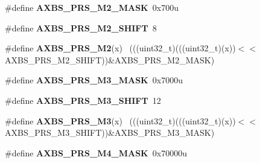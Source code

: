 \begin{DoxyCompactItemize}
\item 
\hypertarget{group___a_x_b_s___register___masks_gacd2feac8facc9d0b21f438eef172fd81}{}\#define {\bfseries A\+X\+B\+S\+\_\+\+P\+R\+S\+\_\+\+M2\+\_\+\+M\+A\+S\+K}~0x700u\label{group___a_x_b_s___register___masks_gacd2feac8facc9d0b21f438eef172fd81}

\item 
\hypertarget{group___a_x_b_s___register___masks_gacf78955a5852e31c71c1542d873df6b3}{}\#define {\bfseries A\+X\+B\+S\+\_\+\+P\+R\+S\+\_\+\+M2\+\_\+\+S\+H\+I\+F\+T}~8\label{group___a_x_b_s___register___masks_gacf78955a5852e31c71c1542d873df6b3}

\item 
\hypertarget{group___a_x_b_s___register___masks_ga62c82426cf92f9a2296ab84014ee8096}{}\#define {\bfseries A\+X\+B\+S\+\_\+\+P\+R\+S\+\_\+\+M2}(x)                                                  ~(((uint32\+\_\+t)(((uint32\+\_\+t)(x))$<$$<$A\+X\+B\+S\+\_\+\+P\+R\+S\+\_\+\+M2\+\_\+\+S\+H\+I\+F\+T))\&A\+X\+B\+S\+\_\+\+P\+R\+S\+\_\+\+M2\+\_\+\+M\+A\+S\+K)\label{group___a_x_b_s___register___masks_ga62c82426cf92f9a2296ab84014ee8096}

\item 
\hypertarget{group___a_x_b_s___register___masks_gab4b4274fe732ec08377a17c98fcb3c89}{}\#define {\bfseries A\+X\+B\+S\+\_\+\+P\+R\+S\+\_\+\+M3\+\_\+\+M\+A\+S\+K}~0x7000u\label{group___a_x_b_s___register___masks_gab4b4274fe732ec08377a17c98fcb3c89}

\item 
\hypertarget{group___a_x_b_s___register___masks_gaf63a98f7cff8ba76061096736d5fa14e}{}\#define {\bfseries A\+X\+B\+S\+\_\+\+P\+R\+S\+\_\+\+M3\+\_\+\+S\+H\+I\+F\+T}~12\label{group___a_x_b_s___register___masks_gaf63a98f7cff8ba76061096736d5fa14e}

\item 
\hypertarget{group___a_x_b_s___register___masks_ga2fa3a214a6e094d0460b17d28fe0754f}{}\#define {\bfseries A\+X\+B\+S\+\_\+\+P\+R\+S\+\_\+\+M3}(x)                                                  ~(((uint32\+\_\+t)(((uint32\+\_\+t)(x))$<$$<$A\+X\+B\+S\+\_\+\+P\+R\+S\+\_\+\+M3\+\_\+\+S\+H\+I\+F\+T))\&A\+X\+B\+S\+\_\+\+P\+R\+S\+\_\+\+M3\+\_\+\+M\+A\+S\+K)\label{group___a_x_b_s___register___masks_ga2fa3a214a6e094d0460b17d28fe0754f}

\item 
\hypertarget{group___a_x_b_s___register___masks_ga489c3dd8930bf3ada2f36146c4e3bc61}{}\#define {\bfseries A\+X\+B\+S\+\_\+\+P\+R\+S\+\_\+\+M4\+\_\+\+M\+A\+S\+K}~0x70000u\label{group___a_x_b_s___register___masks_ga489c3dd8930bf3ada2f36146c4e3bc61}


\end{DoxyCompactItemize}
